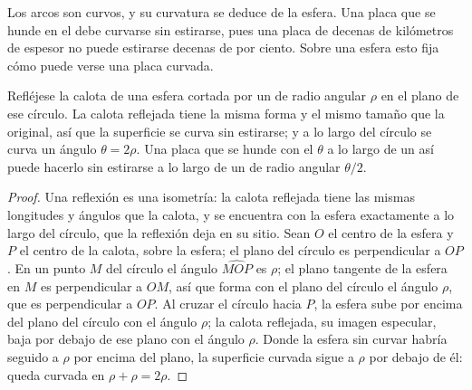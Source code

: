 Los arcos son curvos, y su curvatura se deduce de la esfera. Una placa que se hunde en el  debe curvarse sin estirarse, pues una placa de
decenas de kilómetros de espesor no puede estirarse decenas de por ciento. Sobre una esfera esto fija cómo puede verse una placa curvada.

\begin{proposition}\label{prop:b1:active-margins:shell}
Refléjese la calota de una esfera cortada por un  de radio angular $\rho$ en el plano de ese círculo. La calota reflejada tiene la
misma forma y el mismo tamaño que la original, así que la superficie se curva sin estirarse; y a lo largo del círculo se curva un ángulo
$\theta = 2\rho$. Una placa que se hunde con el  $\theta$ a lo largo de un  así puede hacerlo sin estirarse a lo largo de un
 de radio angular $\theta/2$.
\end{proposition}

\begin{proof}
Una reflexión es una isometría: la calota reflejada tiene las mismas longitudes y ángulos que la calota, y se encuentra con la esfera exactamente
a lo largo del círculo, que la reflexión deja en su sitio. Sean $O$ el centro de la esfera y $P$ el centro de la calota, sobre la esfera; el plano
del círculo es perpendicular a $OP$. En un punto $M$ del círculo el ángulo $\widehat{MOP}$ es $\rho$; el plano tangente de la esfera en $M$ es
perpendicular a $OM$, así que forma con el plano del círculo el ángulo $\rho$, que es perpendicular a $OP$. Al cruzar el círculo hacia $P$, la
esfera sube por encima del plano del círculo con el ángulo $\rho$; la calota reflejada, su imagen especular, baja por debajo de ese plano con el
ángulo $\rho$. Donde la esfera sin curvar habría seguido a $\rho$ por encima del plano, la superficie curvada sigue a $\rho$ por debajo de él:
queda curvada en $\rho + \rho = 2\rho$.
\end{proof}


